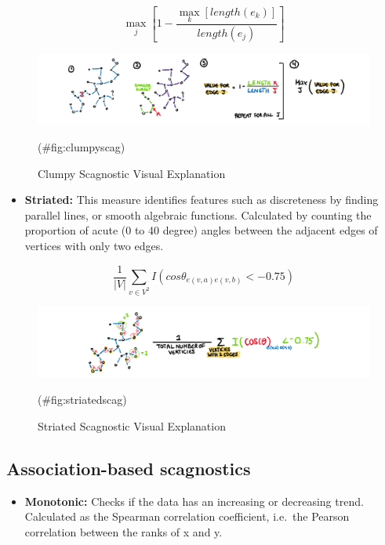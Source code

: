 \[\max_{j}[1-\frac{\max_{k}[length(e_k)]}{length(e_j)}]\]

\begin{Schunk}
\begin{figure}
\includegraphics[width=1\linewidth,height=0.2\textheight]{figures/drawclumpy} \caption[Clumpy Scagnostic Visual Explanation]{Clumpy Scagnostic Visual Explanation}(\#fig:clumpyscag)
\end{figure}
\end{Schunk}

\begin{itemize}
\tightlist
\item
  \textbf{Striated:} This measure identifies features such as
  discreteness by finding parallel lines, or smooth algebraic functions.
  Calculated by counting the proportion of acute (0 to 40 degree) angles
  between the adjacent edges of vertices with only two edges.
\end{itemize}

\[\frac1{|V|}\sum_{v \in V^{2}}I(cos\theta_{e(v,a)e(v,b)}<-0.75)\]

\begin{Schunk}
\begin{figure}
\includegraphics[width=1\linewidth,height=0.2\textheight]{figures/drawstriated} \caption[Striated Scagnostic Visual Explanation]{Striated Scagnostic Visual Explanation}(\#fig:striatedscag)
\end{figure}
\end{Schunk}

\hypertarget{association-based-scagnostics}{%
\subsection{Association-based
scagnostics}\label{association-based-scagnostics}}

\begin{itemize}
\tightlist
\item
  \textbf{Monotonic:} Checks if the data has an increasing or decreasing
  trend. Calculated as the Spearman correlation coefficient, i.e.~the
  Pearson correlation between the ranks of x and y.
\end{itemize}

